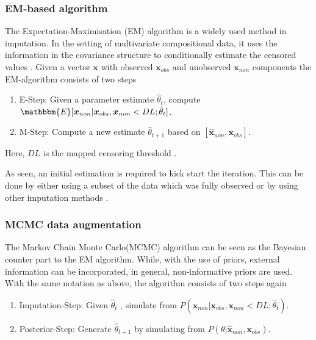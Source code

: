 \subsubsection{EM-based algorithm}
\label{sec:EM Algorithm}

The Expectation-Maximisation (EM) algorithm \cite{Dempster:1977} is a widely used method in imputation. In the setting of multivariate compositional data, it uses the information in the covariance structure to conditionally estimate the censored values \cite{Palarea-Albaladejo:2015}. Given a vector $\bm{x}$ with observed $\bm{x}_{obs}$ and unobserved $\bm{x}_{non}$ components the EM-algorithm consists of two steps

\begin{enumerate}
	\item E-Step: Given a parameter estimate $\hat{\theta}_t$, compute $\mathbbm{E}[\bm{x}_{non}|\bm{x}_{obs},\bm{x}_{non} < DL; \hat{\theta}_t]$.
	\item M-Step: Compute a new estimate $\hat{\theta}_{t+1}$ based on $[\hat{\bm{x}}_{non},\bm{x}_{obs}]$.
\end{enumerate}

Here, $DL$ is the mapped censoring threshold \cite{Palarea-Albaladejo:2015}.

As seen, an initial estimation is required to kick start the iteration. This can be done by either using a subset of the data which was fully observed or by using other imputation methods \cite{Palarea-Albaladejo:2015}. 


\subsubsection{MCMC data augmentation}
\label{sec:MCMC data augmentation}

The Markov Chain Monte Carlo(MCMC) algorithm can be seen as the Bayesian counter part to the EM algorithm. While, with the use of priors, external information can be incorporated, in general, non-informative priors are used. With the same notation as above, the algorithm consists of two steps again

\begin{enumerate}
	\item Imputation-Step: Given $\hat{\theta}_t$ , simulate from $P(\bm{x}_{non}|\bm{x}_{obs},\bm{x}_{non} < DL; \hat{\theta}_t)$.
	\item Posterior-Step: Generate $\hat{\theta}_{t+1}$ by simulating from $P(\theta|\hat{\bm{x}}_{non},\bm{x}_{obs})$. 
\end{enumerate}

